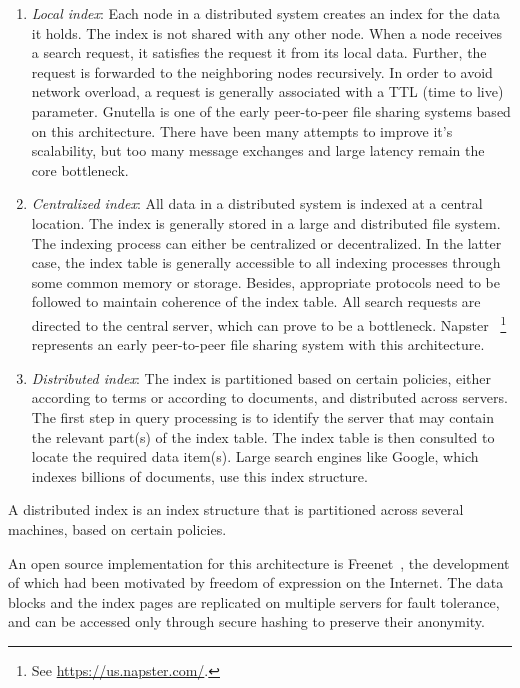 \begin{enumerate}
        \item {\em Local index}: Each node in a distributed system creates an index for the data it holds. The index is not shared
                with any other node. When a node receives a search request, it satisfies the request it from its local data. Further,
                the request is forwarded to the neighboring nodes recursively. In order to avoid network overload, a request is
                generally associated with a TTL (time to live) parameter.
                Gnutella
		is one of the early peer-to-peer
                file sharing systems based on this architecture. There have been many attempts to improve it's scalability, but
                too many message exchanges and large latency remain the core bottleneck.
        \item {\em Centralized index}: All data in a distributed system is indexed at a central location. The index is generally
                stored in a large and distributed file system. The indexing process can either be centralized or decentralized.
                In the latter case, the index table is generally accessible to all indexing processes through some common memory
                or storage. Besides, appropriate protocols need to be followed to maintain coherence of the index table. All
                search requests are directed to the central server, which can prove to be a bottleneck. 
		Napster
		~\footnote{See \url{https://us.napster.com/}.} 
		represents an early peer-to-peer file sharing system with this architecture.
        \item {\em Distributed index}: The index is partitioned based on certain policies, either according to terms or according to 
		documents, and distributed across servers. The first step in query processing is to identify the server that may contain 
		the relevant part(s) of the index table.  The index table is then consulted to locate the required data item(s). Large 
		search engines like Google, which indexes billions of documents, use this index structure.
\end{enumerate}

\begin{definition}
	A distributed index is an index structure that is partitioned across several machines, based on certain policies.
\end{definition}

An open source implementation for this architecture is Freenet~\citep{Clarke:2002}, the development of which had been motivated by 
freedom of expression on the Internet. The data blocks and the index pages are replicated on multiple servers for fault tolerance, 
and can be accessed only through secure hashing to preserve their anonymity.

